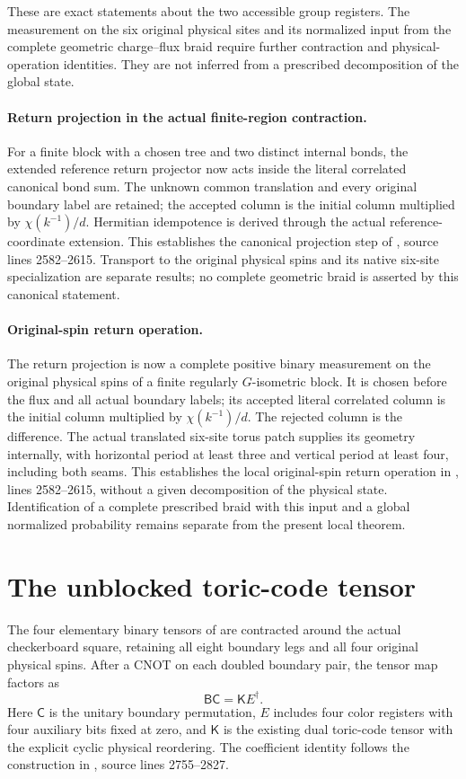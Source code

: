\documentclass{article}
\begin{document}
These are exact statements about the two accessible group registers.
The measurement on the six original physical sites and its normalized
input from the complete geometric charge--flux braid require further
contraction and physical-operation identities. They are not inferred
from a prescribed decomposition of the global state.

\paragraph{Return projection in the actual finite-region contraction.}
For a finite block with a chosen tree and two distinct internal bonds, the
extended reference return projector now acts inside the literal correlated
canonical bond sum. The unknown common translation and every original
boundary label are retained; the accepted column is the initial column
multiplied by $\chi(k^{-1})/d$. Hermitian idempotence is derived through
the actual reference-coordinate extension. This establishes the canonical
projection step of \cite{Schuch2010PEPS}, source lines 2582--2615. Transport to the original
physical spins and its native six-site specialization are separate results;
no complete geometric braid is asserted by this canonical statement.

\paragraph{Original-spin return operation.}
The return projection is now a complete positive binary measurement on the
original physical spins of a finite regularly $G$-isometric block. It is
chosen before the flux and all actual boundary labels; its accepted literal
correlated column is the initial column multiplied by $\chi(k^{-1})/d$.
The rejected column is the difference. The actual translated six-site torus
patch supplies its geometry internally, with horizontal period at least three
and vertical period at least four, including both seams. This establishes the
local original-spin return operation in \cite{Schuch2010PEPS}, lines 2582--2615, without a
given decomposition of the physical state. Identification of a complete
prescribed braid with this input and a global normalized probability remains
separate from the present local theorem.

\section{The unblocked toric-code tensor}
The four elementary binary tensors of
 are contracted around the actual checkerboard
square, retaining all eight boundary legs and all four original physical
spins. After a CNOT on each doubled boundary pair, the tensor map factors as
\[
    \mathsf B\mathsf C=\mathsf K E^\dagger.
\]
Here $\mathsf C$ is the unitary boundary permutation, $E$ includes four
color registers with four auxiliary bits fixed at zero, and $\mathsf K$
is the existing dual toric-code tensor with the explicit cyclic physical
reordering. The coefficient identity follows the construction in
\cite{Schuch2010PEPS}, source lines 2755--2827.
\end{document}
